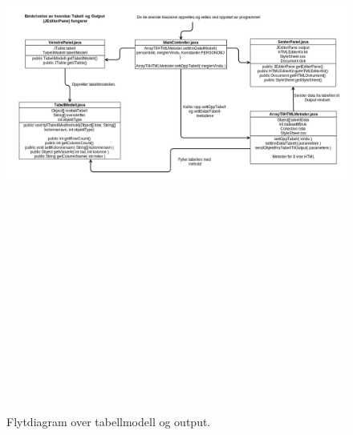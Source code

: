 \begin{figure}[ht]
\begin{center}
 \includegraphics[angle=90 , height=21cm]{./img/appendix/diagram/tabell_og_output.png}
 \caption{Flytdiagram over tabellmodell og output.}
 \label{fig:tabell_og_output}
  \end{center}
\end{figure}